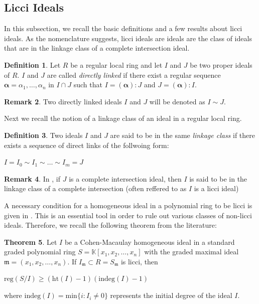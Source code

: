 \documentclass[oneside, 12pt]{amsart} \topmargin      -10mm \textwidth      160 true mm
\theoremstyle{definition}
\newtheorem{theorem'}{Theorem}[subsection]
\newtheorem{definition'}[theorem']{Definition}
\newtheorem{remark'}[theorem']{Remark}
\numberwithin{equation}{section}
\begin{document}
\subsection{Licci Ideals} In this subsection, we recall the basic definitions and a few results about licci ideals. As the nomenclature suggests, licci ideals are ideals are the class of ideals that are in the linkage class of a complete intersection ideal. 
\begin{definition'}
   Let  $R$ be a regular local ring and let $I$ and $J$ be two proper ideals of $R$. $I$ and $J$ are called \textit{directly linked} if there exist a regular sequence $\boldsymbol{\alpha}=\alpha_1,\dots,\alpha_n $ in $I \cap J$ such that $I=(\boldsymbol{\alpha}):J$ and $J=(\boldsymbol{\alpha}):I$.  
\end{definition'}
\begin{remark'}
Two directly linked ideals $I$ and $J$ will be denoted as $I \sim J$.
\end{remark'}   
\noindent Next we recall the notion of a linkage class of an ideal in a regular local ring.

\begin{definition'}\label{Linkage class def}
Two ideals $I$ and $J$ are said to be in the same \textit{linkage class} if there exists a sequence of direct links of the follwoing form: 
\begin{center}
    $I=I_0\sim I_1 \sim \dots \sim I_m = J $
\end{center}
\end{definition'}
\begin{remark'}
 In , if $J$ is a complete intersection ideal, then $I$ is said to be in the linkage class of a complete intersection (often reffered to as $I$ is a licci ideal)  
\end{remark'}
 
  A necessary condition for a homogeneous ideal in a polynomial ring to be licci is given in \cite{huneke1987structure}. This is an essential tool in order to rule out various classes of non-licci ideals. Therefore, we recall the following theorem from the literature: 

\begin{theorem'}\cite[Corollary~5.12.]{huneke1987structure}\label{reg condition}
     Let $I$ be a Cohen-Macaulay homogeneous ideal in a standard graded polynomial ring $S = \mathbb{K}[x_1,x_2,\dots,x_n]$ with the graded maximal
 ideal $\mathfrak{m}=(x_1,x_2,\dots,x_n)$. If $I_{\mathfrak{m}} \subset R = S_{\mathfrak{m}}$ is licci, then
 \begin{center}
     $\mathrm{reg} (S/I) \geq (\mathrm{ht}(I)-1)(\mathrm{indeg}(I)-1)$
 \end{center}
where $\mathrm{indeg}(I)=\mathrm{min} \{i : I_i \neq 0\}$ represents the initial degree of the ideal $I$.

\end{theorem'}
\end{document}

